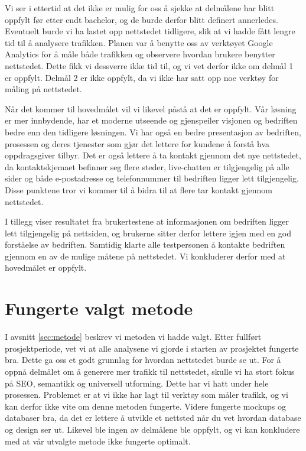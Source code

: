Vi ser i ettertid at det ikke er mulig for oss å sjekke at delmålene har blitt oppfylt før etter endt bachelor, og de burde derfor blitt definert annerledes. Eventuelt burde vi ha lastet opp nettstedet tidligere, slik at vi hadde fått lengre tid til å analysere trafikken. Planen var å benytte oss av verktøyet Google Analytics for å måle både trafikken og observere hvordan brukere benytter nettstedet. Dette fikk vi dessverre ikke tid til, og vi vet derfor ikke om delmål 1 er oppfylt. Delmål 2 er ikke oppfylt, da vi ikke har satt opp noe verktøy for måling på nettstedet.

Når det kommer til hovedmålet vil vi likevel påstå at det er oppfylt. Vår løsning er mer innbydende, har et moderne utseende og gjenspeiler visjonen og bedriften bedre enn den tidligere løsningen. Vi har også en bedre presentasjon av bedriften, prosessen og deres tjenester som gjør det lettere for kundene å forstå hva oppdragsgiver tilbyr. Det er også lettere å ta kontakt gjennom det nye nettstedet, da kontaktskjemaet befinner seg flere steder, live-chatten er tilgjengelig på alle sider og både e-postadresse og telefonnummer til bedriften ligger lett tilgjengelig. Disse punktene tror vi kommer til å bidra til at flere tar kontakt gjennom nettstedet. 

I tillegg viser resultatet fra brukertestene at informasjonen om bedriften ligger lett tilgjengelig på nettsiden, og brukerne sitter derfor lettere igjen med en god forståelse av bedriften. Samtidig klarte alle testpersonen å kontakte bedriften gjennom en av de mulige måtene på nettstedet. Vi konkluderer derfor med at hovedmålet er oppfylt. 


\section{Fungerte valgt metode}
I avsnitt \ref{sec:metode} beskrev vi metoden vi hadde valgt. Etter fullført prosjektperiode, vet vi at alle analysene vi gjorde i starten av prosjektet fungerte bra. Dette ga oss et godt grunnlag for hvordan nettstedet burde se ut. For å oppnå delmålet om å generere mer trafikk til nettstedet, skulle vi ha stort fokus på SEO, semantikk og universell utforming. Dette har vi hatt under hele prosessen. Problemet er at vi ikke har lagt til verktøy som måler trafikk, og vi kan derfor ikke vite om denne metoden fungerte. Videre fungerte mockups og databaser bra, da det er lettere å utvikle et nettsted når du vet hvordan database og design ser ut. Likevel ble ingen av delmålene ble oppfylt, og vi kan konkludere med at vår utvalgte metode ikke fungerte optimalt.


